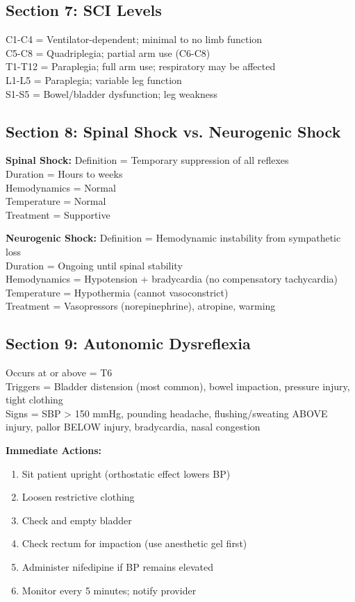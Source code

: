 \documentclass[11pt]{article}
\begin{document}
\subsection*{Section 7: SCI Levels}
C1-C4 = Ventilator-dependent; minimal to no limb function\\
C5-C8 = Quadriplegia; partial arm use (C6-C8)\\
T1-T12 = Paraplegia; full arm use; respiratory may be affected\\
L1-L5 = Paraplegia; variable leg function\\
S1-S5 = Bowel/bladder dysfunction; leg weakness

\subsection*{Section 8: Spinal Shock vs. Neurogenic Shock}
\textbf{Spinal Shock:}
Definition = Temporary suppression of all reflexes\\
Duration = Hours to weeks\\
Hemodynamics = Normal\\
Temperature = Normal\\
Treatment = Supportive

\textbf{Neurogenic Shock:}
Definition = Hemodynamic instability from sympathetic loss\\
Duration = Ongoing until spinal stability\\
Hemodynamics = Hypotension + bradycardia (no compensatory tachycardia)\\
Temperature = Hypothermia (cannot vasoconstrict)\\
Treatment = Vasopressors (norepinephrine), atropine, warming

\subsection*{Section 9: Autonomic Dysreflexia}
Occurs at or above = T6\\
Triggers = Bladder distension (most common), bowel impaction, pressure injury, tight clothing\\
Signs = SBP > 150 mmHg, pounding headache, flushing/sweating ABOVE injury, pallor BELOW injury, bradycardia, nasal congestion

\textbf{Immediate Actions:}
\begin{enumerate}
    \item Sit patient upright (orthostatic effect lowers BP)
    \item Loosen restrictive clothing
    \item Check and empty bladder
    \item Check rectum for impaction (use anesthetic gel first)
    \item Administer nifedipine if BP remains elevated
    \item Monitor every 5 minutes; notify provider
\end{enumerate}
\end{document}
